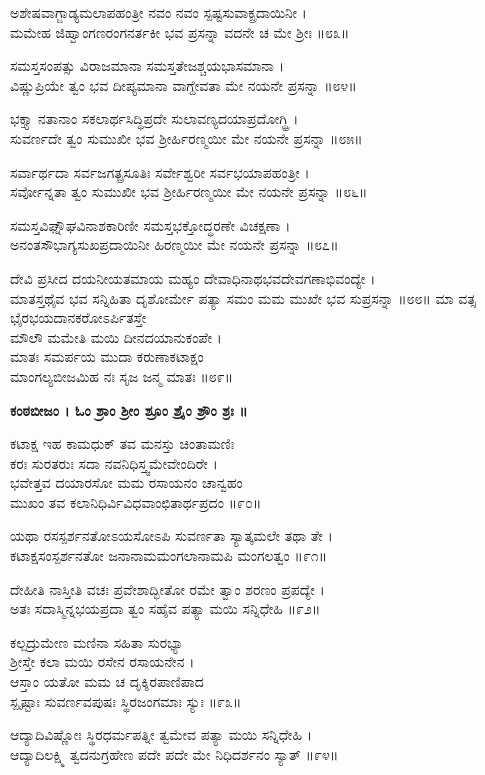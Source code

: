 	ಅಶೇಷವಾಗ್ಜಾಡ್ಯಮಲಾಪಹಂತ್ರೀ ನವಂ ನವಂ ಸ್ಪಷ್ಟಸುವಾಕ್ಪ್ರದಾಯಿನೀ ।\\
	ಮಮೇಹ ಜಿಹ್ವಾಂಗಣರಂಗನರ್ತಕೀ ಭವ ಪ್ರಸನ್ನಾ ವದನೇ ಚ ಮೇ ಶ್ರೀಃ ॥೮೩॥

ಸಮಸ್ತಸಂಪತ್ಸು ವಿರಾಜಮಾನಾ ಸಮಸ್ತತೇಜಶ್ಚಯಭಾಸಮಾನಾ ।\\
ವಿಷ್ಣುಪ್ರಿಯೇ ತ್ವಂ ಭವ ದೀಪ್ಯಮಾನಾ ವಾಗ್ದೇವತಾ ಮೇ ನಯನೇ ಪ್ರಸನ್ನಾ ॥೮೪॥

	ಭಕ್ತ್ಯಾ ನತಾನಾಂ ಸಕಲಾರ್ಥಸಿದ್ಧಿಪ್ರದೇ ಸುಲಾವಣ್ಯದಯಾಪ್ರದೋಗ್ಧ್ರಿ ।\\
	ಸುವರ್ಣದೇ ತ್ವಂ ಸುಮುಖೀ ಭವ ಶ್ರೀರ್ಹಿರಣ್ಮಯೀ ಮೇ ನಯನೇ ಪ್ರಸನ್ನಾ ॥೮೫॥

ಸರ್ವಾರ್ಥದಾ ಸರ್ವಜಗತ್ಪ್ರಸೂತಿಃ ಸರ್ವೇಶ್ವರೀ ಸರ್ವಭಯಾಪಹಂತ್ರೀ ।\\
ಸರ್ವೋನ್ನತಾ ತ್ವಂ ಸುಮುಖೀ ಭವ ಶ್ರೀರ್ಹಿರಣ್ಮಯೀ ಮೇ ನಯನೇ ಪ್ರಸನ್ನಾ ॥೮೬॥

	ಸಮಸ್ತವಿಘ್ನೌಘವಿನಾಶಕಾರಿಣೀ ಸಮಸ್ತಭಕ್ತೋದ್ಧರಣೇ ವಿಚಕ್ಷಣಾ ।\\
	ಅನಂತಸೌಭಾಗ್ಯಸುಖಪ್ರದಾಯಿನೀ ಹಿರಣ್ಮಯೀ ಮೇ ನಯನೇ ಪ್ರಸನ್ನಾ ॥೮೭॥

ದೇವಿ ಪ್ರಸೀದ ದಯನೀಯತಮಾಯ ಮಹ್ಯಂ ದೇವಾಧಿನಾಥಭವದೇವಗಣಾಭಿವಂದ್ಯೇ ।\\
ಮಾತಸ್ತಥೈವ ಭವ ಸನ್ನಿಹಿತಾ ದೃಶೋರ್ಮೇ ಪತ್ಯಾ ಸಮಂ ಮಮ ಮುಖೇ ಭವ ಸುಪ್ರಸನ್ನಾ ॥೮೮॥
\newpage
	ಮಾ ವತ್ಸ ಭೈರಭಯದಾನಕರೋಽರ್ಪಿತಸ್ತೇ\\ ಮೌಲೌ ಮಮೇತಿ ಮಯಿ ದೀನದಯಾನುಕಂಪೇ ।\\
	ಮಾತಃ ಸಮರ್ಪಯ ಮುದಾ ಕರುಣಾಕಟಾಕ್ಷಂ\\ ಮಾಂಗಲ್ಯಬೀಜಮಿಹ ನಃ ಸೃಜ ಜನ್ಮ ಮಾತಃ ॥೮೯॥

{\bfseries  ಕಂಠಬೀಜಂ । ಓಂ ಶ್ರಾಂ ಶ್ರೀಂ ಶ್ರೂಂ ಶ್ರೈಂ ಶ್ರೌಂ ಶ್ರಃ ॥}

ಕಟಾಕ್ಷ ಇಹ ಕಾಮಧುಕ್ ತವ ಮನಸ್ತು ಚಿಂತಾಮಣಿಃ\\ ಕರಃ ಸುರತರುಃ ಸದಾ ನವನಿಧಿಸ್ತ್ವಮೇವೇಂದಿರೇ ।\\
ಭವೇತ್ತವ ದಯಾರಸೋ ಮಮ ರಸಾಯನಂ ಚಾನ್ವಹಂ\\ ಮುಖಂ ತವ ಕಲಾನಿಧಿರ್ವಿವಿಧವಾಂಛಿತಾರ್ಥಪ್ರದಂ ॥೯೦॥

	ಯಥಾ ರಸಸ್ಪರ್ಶನತೋಽಯಸೋಽಪಿ ಸುವರ್ಣತಾ ಸ್ಯಾತ್ಕಮಲೇ ತಥಾ ತೇ ।\\
	ಕಟಾಕ್ಷಸಂಸ್ಪರ್ಶನತೋ ಜನಾನಾಮಮಂಗಲಾನಾಮಪಿ ಮಂಗಲತ್ವಂ ॥೯೧॥
	
ದೇಹೀತಿ ನಾಸ್ತೀತಿ ವಚಃ ಪ್ರವೇಶಾದ್ಭೀತೋ ರಮೇ ತ್ವಾಂ ಶರಣಂ ಪ್ರಪದ್ಯೇ ।\\
ಅತಃ ಸದಾಸ್ಮಿನ್ನಭಯಪ್ರದಾ ತ್ವಂ ಸಹೈವ ಪತ್ಯಾ ಮಯಿ ಸನ್ನಿಧೇಹಿ ॥೯೨॥

	ಕಲ್ಪದ್ರುಮೇಣ ಮಣಿನಾ ಸಹಿತಾ ಸುರಭ್ಯಾ \\ಶ್ರೀಸ್ತೇ ಕಲಾ ಮಯಿ ರಸೇನ ರಸಾಯನೇನ ।\\
	ಆಸ್ತಾಂ ಯತೋ ಮಮ ಚ ದೃಕ್ಶಿರಪಾಣಿಪಾದ\\ಸ್ಪೃಷ್ಟಾಃ ಸುವರ್ಣವಪುಷಃ ಸ್ಥಿರಜಂಗಮಾಃ ಸ್ಯುಃ ॥೯೩॥

ಆದ್ಯಾದಿವಿಷ್ಣೋಃ ಸ್ಥಿರಧರ್ಮಪತ್ನೀ ತ್ವಮೇವ ಪತ್ಯಾ ಮಯಿ ಸನ್ನಿಧೇಹಿ ।\\
ಆದ್ಯಾದಿಲಕ್ಷ್ಮಿ ತ್ವದನುಗ್ರಹೇಣ ಪದೇ ಪದೇ ಮೇ ನಿಧಿದರ್ಶನಂ ಸ್ಯಾತ್ ॥೯೪॥

